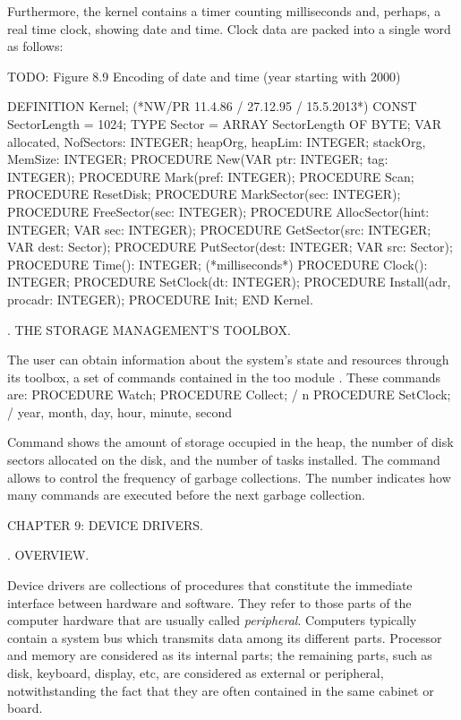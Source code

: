 Furthermore, the kernel contains a timer counting milliseconds and, perhaps, a real time clock, showing date and time. Clock data are packed into a single word as follows:

TODO: Figure 8.9 Encoding of date and time (year starting with 2000)

\begintt
DEFINITION Kernel; (*NW/PR 11.4.86 / 27.12.95 / 15.5.2013*) CONST SectorLength = 1024;
TYPE Sector = ARRAY SectorLength OF BYTE;
VAR allocated, NofSectors: INTEGER;
heapOrg, heapLim: INTEGER;
stackOrg, MemSize: INTEGER;
PROCEDURE New(VAR ptr: INTEGER; tag: INTEGER); PROCEDURE Mark(pref: INTEGER);
PROCEDURE Scan;
PROCEDURE ResetDisk;
PROCEDURE MarkSector(sec: INTEGER);
PROCEDURE FreeSector(sec: INTEGER);
PROCEDURE AllocSector(hint: INTEGER; VAR sec: INTEGER); PROCEDURE GetSector(src: INTEGER; VAR dest: Sector); PROCEDURE PutSector(dest: INTEGER; VAR src: Sector); PROCEDURE Time(): INTEGER; (*milliseconds*)
PROCEDURE Clock(): INTEGER;
PROCEDURE SetClock(dt: INTEGER);
PROCEDURE Install(adr, procadr: INTEGER);
PROCEDURE Init;
END Kernel.
\endtt

. THE STORAGE MANAGEMENT'S TOOLBOX.

The user can obtain information about the system's state and resources through its toolbox, a set of commands contained in the too module . These commands are:
\begintt
PROCEDURE Watch;
PROCEDURE Collect; / n
PROCEDURE SetClock; / year, month, day, hour, minute, second
\endtt

\noindent Command  shows the amount of storage occupied in the heap, the number of disk sectors allocated on the disk, and the number of tasks installed. The command  allows to control the frequency of garbage collections. The number  indicates how many commands are executed before the next garbage collection.

\beginchapter CHAPTER 9: DEVICE DRIVERS.

. OVERVIEW.

Device drivers are collections of procedures that constitute the immediate interface between hardware and software. They refer to those parts of the computer hardware that are usually called \emph{peripheral}. Computers typically contain a system bus which transmits data among its different parts. Processor and memory are considered as its internal parts; the remaining parts, such as disk, keyboard, display, etc, are considered as external or peripheral, notwithstanding the fact that they are often contained in the same cabinet or board.

